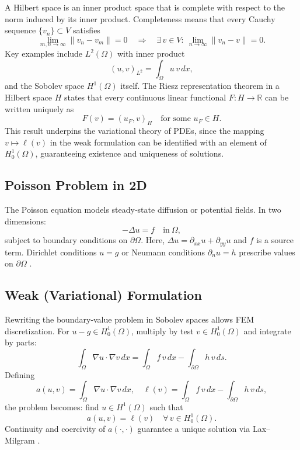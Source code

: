 A Hilbert space is an inner product space that is complete with respect to the norm induced by its inner product.  Completeness means that every Cauchy sequence $\{v_n\}\subset V$ satisfies
\begin{equation}
  \lim_{m,n\to\infty}\|v_n - v_m\| = 0
  \quad\Longrightarrow\quad
  \exists\,v\in V:\ \lim_{n\to\infty}\|v_n - v\| = 0.
\end{equation}
Key examples include $L^2(\Omega)$ with inner product
\begin{equation}
  (u,v)_{L^2} = \int_\Omega u\,v\,dx,
\end{equation}
and the Sobolev space $H^1(\Omega)$ itself.  The Riesz representation theorem in a Hilbert space $H$ states that every continuous linear functional $F:H\to\mathbb{R}$ can be written uniquely as
\begin{equation}
  F(v) = (u_F, v)_H
  \quad\text{for some }u_F\in H.
\end{equation}
This result underpins the variational theory of PDEs, since the mapping $v\mapsto\ell(v)$ in the weak formulation can be identified with an element of $H_0^1(\Omega)$, guaranteeing existence and uniqueness of solutions. \cite{inner_product_space}

\subsection{Poisson Problem in 2D}

The Poisson equation models steady‐state diffusion or potential fields.  In two dimensions:
\begin{equation}
  -\Delta u = f \quad \text{in}\ \Omega,
\end{equation}
subject to boundary conditions on $\partial\Omega$.  Here, $\Delta u=\partial_{xx}u+\partial_{yy}u$ and $f$ is a source term.  Dirichlet conditions $u=g$ or Neumann conditions $\partial_n u=h$ prescribe values on $\partial\Omega$ \cite{poisson_equation, dirichlet_boundary_condition, neumann_boundary_condition}.

\subsection{Weak (Variational) Formulation}

Rewriting the boundary‐value problem in Sobolev spaces allows FEM discretization.  For $u-g\in H_0^1(\Omega)$, multiply by test $v\in H_0^1(\Omega)$ and integrate by parts:
\begin{equation}
  \int_\Omega \nabla u\cdot\nabla v\,dx
  = \int_\Omega f\,v\,dx
  - \int_{\partial\Omega} h\,v\,ds.
\end{equation}
Defining
\begin{equation}
  a(u,v)=\int_\Omega\nabla u\cdot\nabla v\,dx,\quad
  \ell(v)=\int_\Omega f\,v\,dx-\int_{\partial\Omega}h\,v\,ds,
\end{equation}
the problem becomes: find $u\in H^1(\Omega)$ such that
\begin{equation}
  a(u,v)=\ell(v)\quad\forall\,v\in H_0^1(\Omega).
\end{equation}
Continuity and coercivity of $a(\cdot,\cdot)$ guarantee a unique solution via Lax–Milgram \cite{weak_formulation}.

